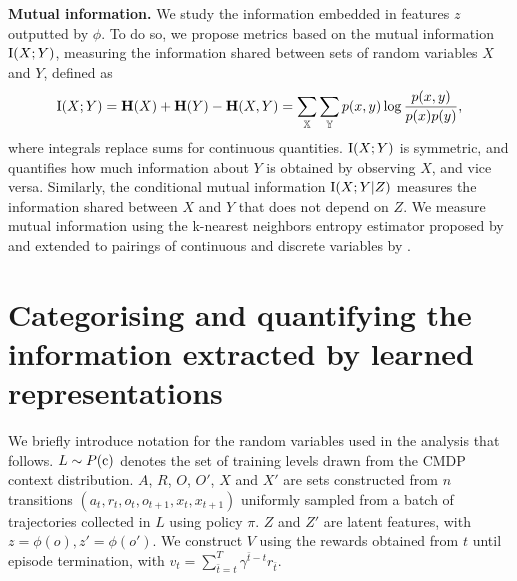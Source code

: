 \textbf{Mutual information.} We study the information embedded in features $z$ outputted by $\phi$. To do so, we propose metrics based on the mutual information $\text{I}(X;Y)$, measuring the information shared between sets of random variables $X$ and $Y$, defined as
\begin{equation}
    \text{I}(X;Y) = \mathbf{H}(X) + \mathbf{H}(Y) - \mathbf{H}(X,Y) = \sum_{{\mathbb{X}}} \sum_{{\mathbb{Y}}} p(x, y) \log \frac{p(x, y)}{p(x)p(y)},
\end{equation}
where integrals replace sums for continuous quantities. $\text{I}(X;Y)$ is symmetric, and quantifies how much information about $Y$ is obtained by observing $X$, and vice versa. Similarly, the conditional mutual information $\text{I}(X;Y|Z)$ measures the information shared between $X$ and $Y$ that does not depend on $Z$. %
We measure mutual information using the k-nearest neighbors entropy estimator proposed by \citet{kraskov2004estimating} and extended to pairings of continuous and discrete variables by \citet{ross2014mutual}.
%
\section[Categorising and quantifying extracted information]{Categorising and quantifying the information extracted by learned representations}\label{c2:sec:met}

We briefly introduce notation for the random variables used in the analysis that follows. $L\sim P({\textnormal{c}})$ denotes the set of training levels drawn from the CMDP context distribution. $A$, $R$, $O$, $O'$, $X$ and $X'$ are sets constructed from $n$ transitions $( a_t, r_t, o_t, o_{t+1}, x_t, x_{t+1})$ uniformly sampled from a batch of trajectories collected in $L$ using policy $\pi$. $Z$ and $Z'$ are latent features, with $z=\phi(o),z'=\phi(o')$. We construct $V$ using the rewards obtained from $t$ until episode termination, with $v_t =\sum^{T}_{\bar{t}=t}\gamma^{\bar{t} - t} r_{\bar{t}}$.

